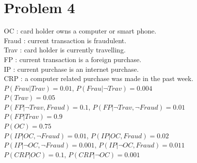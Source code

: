 \documentclass{article}
\begin{document}
\section*{Problem 4}
    OC : card holder owns a computer or smart phone.\\
	Fraud : current transaction is fraudulent.\\
	Trav : card holder is currently travelling.\\
	FP : current transaction is a foreign purchase.\\
	IP : current purchase is an internet purchase.\\
	CRP : a computer related purchase was made in the past week.\\
	$P(Frau|Trav) = 0.01$, $P(Frau|\neg Trav) = 0.004$\\
	$P(Trav) = 0.05$\\
	$P(FP|\neg Trav,Fraud) = 0.1$, $P(FP|\neg Trav,\neg Fraud) = 0.01$\\
	$P(FP|Trav) = 0.9$\\
	$P(OC)=0.75$\\
	$P(IP|OC,\neg Fraud) = 0.01$, $P(IP|OC, Fraud) = 0.02$\\
	$P(IP|\neg OC,\neg Fraud) = 0.001$, $P(IP|\neg OC,Fraud) = 0.011$\\
	$P(CRP|OC) = 0.1$, $P(CRP|\neg OC) = 0.001$
\end{document}
